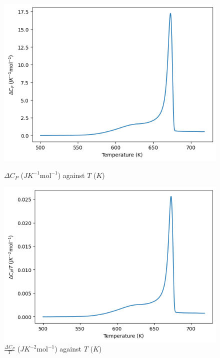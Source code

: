 \documentclass{article}
\begin{document}
\captionsetup[figure]{font=small,labelfont=small}
\begin{figure}[!htb]
    \centering
    \begin{minipage}{0.45\textwidth}
        \centering
        \includegraphics[scale=0.43]{f1_cp.png}
        \caption{$\Delta C_P$ ($JK^{-1}\text{mol}^{-1}$)
        against $T$ ($K$)}
    \end{minipage}\hfill
    \begin{minipage}{0.45\textwidth}
        \centering
        \includegraphics[scale=0.43]{f2_cp_over_t.png}
        \caption{$\displaystyle\frac{\Delta C_P}{T}$ ($JK^{-2}\text{mol}^{-1}$)
        against $T$ ($K$)}
    \end{minipage}
\end{figure}
\end{document}
